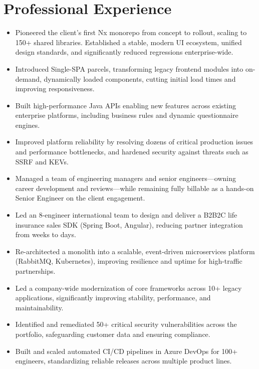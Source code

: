 \section*{Professional Experience}

\begin{itemize}
    \item Pioneered the client's first Nx monorepo from concept to rollout, scaling to 150+ shared libraries. Established a stable, modern UI ecosystem, unified design standards, and significantly reduced regressions enterprise-wide.
    \item Introduced Single-SPA parcels, transforming legacy frontend modules into on-demand, dynamically loaded components, cutting initial load times and improving responsiveness.
    \item Built high-performance Java APIs enabling new features across existing enterprise platforms, including business rules and dynamic questionnaire engines.
    \item Improved platform reliability by resolving dozens of critical production issues and performance bottlenecks, and hardened security against threats such as SSRF and KEVs.
    \item Managed a team of engineering managers and senior engineers—owning career development and reviews—while remaining fully billable as a hands-on Senior Engineer on the client engagement.
\end{itemize}
\vspace{\spacingBetweenJobs}

\begin{itemize}
    \item Led an 8-engineer international team to design and deliver a B2B2C life insurance sales SDK (Spring Boot, Angular), reducing partner integration from weeks to days.
    \item Re-architected a monolith into a scalable, event-driven microservices platform (RabbitMQ, Kubernetes), improving resilience and uptime for high-traffic partnerships.
    \item Led a company-wide modernization of core frameworks across 10+ legacy applications, significantly improving stability, performance, and maintainability.
    \item Identified and remediated 50+ critical security vulnerabilities across the portfolio, safeguarding customer data and ensuring compliance.
    \item Built and scaled automated CI/CD pipelines in Azure DevOps for 100+ engineers, standardizing reliable releases across multiple product lines.
\end{itemize}
\vspace{\spacingBetweenJobs}

